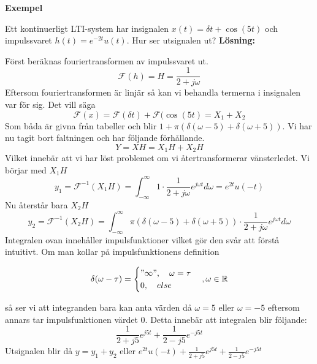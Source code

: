 \documentclass{article}
\begin{document}
\textbf{Exempel} %

Ett kontinuerligt LTI-system har insignalen $x(t)=\delta{t} + \cos(5 t)$ och impulssvaret $h(t) = e^{-2 t} u(t)$. Hur ser utsignalen ut?
\textbf{Lösning:}

Först beräknas fouriertransformen av impulssvaret ut. 
\[\mathcal{F}(h) = H = \frac{1}{2+j \omega}\]
Eftersom fouriertransformen är linjär så kan vi behandla termerna i insignalen var för sig. Det vill säga 
\[\mathcal{F} (x) = \mathcal{F}(\delta{t}) + \mathcal{F}(\cos(5 t) = X_1 + X_2 \]
Som båda är givna från tabeller och blir $1+\pi(\delta(\omega - 5) + \delta(\omega + 5))$. Vi har nu tagit bort faltningen och har följande förhållande.
\[Y = X H = X_1 H + X_2 H\]
Vilket innebär att vi har löst problemet om vi återtransformerar vänsterledet. Vi börjar med $X_1 H$
\[y_1=\mathcal{F}^{-1}(X_1 H) =  \int_{-\infty}^{\infty} 1 \cdot \frac{1}{2+j \omega} e^{j \omega t} d\omega = e^{2 t} u(-t)\]
Nu återstår bara $X_2 H$
\[y_2=\mathcal{F}^{-1}(X_2 H) = \int_{-\infty}^{\infty} \pi(\delta(\omega - 5) + \delta(\omega + 5)) \cdot \frac{1}{2+j \omega} e^{j \omega t} d\omega \]
Integralen ovan innehåller impulsfunktioner vilket gör den svår att förstå intuitivt. Om man kollar på impulsfunktionens definition 

\[
\delta(\omega - \tau)=
\begin{cases}
"\infty",\quad \omega = \tau \\
0, \quad else
\end{cases}, \omega \in \mathbb{R}
\]

så ser vi att integranden bara kan anta värden då $\omega=5$ eller $\omega =-5$ eftersom annars tar impulsfunktionen värdet 0. Detta innebär att integralen blir följande:
\[\frac{1}{2+j 5} e^{j 5 t} + \frac{1}{2-j 5} e^{-j 5 t}\] %
Utsignalen blir då $y=y_1 + y_2$ eller $e^{2 t} u(-t) + \frac{1}{2+j 5} e^{j 5 t} + \frac{1}{2-j 5} e^{-j 5 t}$
\end{document}
